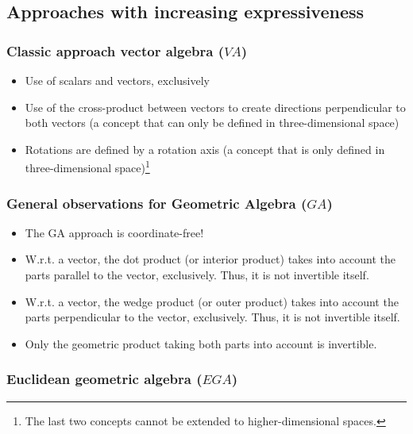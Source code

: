 \subsection{Approaches with increasing expressiveness}
\label{subsection_comparison_of_approaches}

\subsubsection{Classic approach vector algebra ($V\!A$)}

\begin{itemize}
    \item Use of scalars and vectors, exclusively
    \item Use of the cross-product between vectors to create directions perpendicular to
    both vectors (a concept that can only be defined in three-dimensional space)
    \item Rotations are defined by a rotation axis (a concept that is only defined in
    three-dimensional space)\footnote{The last two concepts cannot be extended to
    higher-dimensional spaces.}
\end{itemize}

\subsubsection{General observations for Geometric Algebra ($GA$)}

\begin{itemize}
    \item The GA approach is coordinate-free!
    \item W.r.t. a vector, the dot product (or interior product) takes into account the
    parts parallel to the vector, exclusively. Thus, it is not invertible itself.
    \item W.r.t. a vector, the wedge product (or outer product) takes into account the
    parts perpendicular to the vector, exclusively. Thus, it is not invertible itself.
    \item Only the geometric product taking both parts into account is invertible.
\end{itemize}

\subsubsection{Euclidean geometric algebra ($EGA$)}

